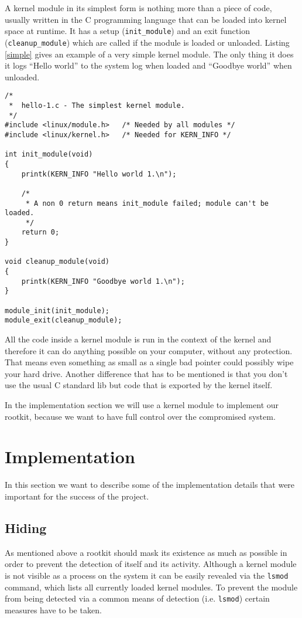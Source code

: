 \documentclass[12pt]{article}
\newcommand{\shellcmdinline}[1]{\texttt{\footnotesize #1}}
\begin{document}
A kernel module in its simplest form is nothing more than a piece of code, usually written in the C programming language that can be loaded into kernel space at runtime. It has a setup (\texttt{init\_module}) and an exit function (\texttt{cleanup\_module}) which are called if the module is loaded or unloaded. Listing \ref{simple} gives an example of a very simple kernel module. The only thing it does it logs ``Hello world'' to the system log when loaded and ``Goodbye world'' when unloaded.

\begin{lstlisting}[caption=Source: \url{http://www.tldp.org/LDP/lkmpg/2.6/html/x121.html}., label=simple]
/*  
 *  hello-1.c - The simplest kernel module.
 */
#include <linux/module.h>	/* Needed by all modules */
#include <linux/kernel.h>	/* Needed for KERN_INFO */

int init_module(void)
{
	printk(KERN_INFO "Hello world 1.\n");

	/* 
	 * A non 0 return means init_module failed; module can't be loaded. 
	 */
	return 0;
}

void cleanup_module(void)
{
	printk(KERN_INFO "Goodbye world 1.\n");
}

module_init(init_module);
module_exit(cleanup_module);
\end{lstlisting}

All the code inside a kernel module is run in the context of the kernel and therefore it can do anything possible on your computer, without any protection. That means even something as small as a single bad pointer could possibly wipe your hard drive. Another difference that has to be mentioned is that you don't use the usual C standard lib but code that is exported by the kernel itself. 

In the implementation section we will use a kernel module to implement our rootkit, because we want to have full control over the compromised system.
\newpage
\section{Implementation}
\label{sec:impl}
In this section we want to describe some of the implementation details that were important for the success of the project.
\subsection{Hiding}
As mentioned above a rootkit should mask its existence as much as possible in order to prevent the detection of itself and its activity. Although a kernel module is not visible as a process on the system it can be easily revealed via the \shellcmdinline{lsmod} command, which lists all currently loaded kernel modules. To prevent the module from being detected via a common means of detection (i.e. \shellcmdinline{lsmod}) certain measures have to be taken.
\end{document}
